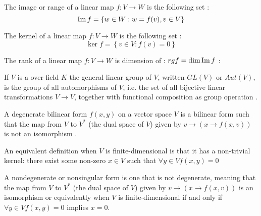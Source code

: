 \begin{appendices}
\begin{definition}[Image]
  The image or range of a linear map $f: V \to W$ is the following
  set \cite{wiki:linearmap}:
  \[
  \operatorname{Im} f = \left\{
  w \in W: w = f(v), v \in V
  \right\}
  \]
  \label{def:image}
\end{definition}

\begin{definition}[Kernel]
  The kernel of a linear map $f: V \to W$ is the following
  set \cite{wiki:kernel}:
  \[
  \ker f = \left\{
  v \in V: f(v) = 0
  \right\}
  \]
  \label{def:kernel}
\end{definition}


\begin{definition}[Rank]
  The rank of a linear map $f: V \to W$ is dimension of
  : $rg f = \dim \operatorname{Im} f$ \cite{wiki:rank}:
  \label{def:rank}
\end{definition}

\begin{definition}
  If $V$ is a  over field $K$  the general
  linear group of $V$, written $GL\left(V\right)$ or
  $Aut\left(V\right)$, is the group of all automorphisms of $V$,
  i.e. the set of all bijective linear transformations $V \to V$,
  together with functional composition as group operation \cite{wiki:glg}.  
  \label{def:glv}
\end{definition}

\begin{definition}
  A degenerate bilinear form $f(x, y)$ on a vector space $V$ is a
  bilinear form such that the map from $V$ to $V^\ast$ (the dual space
  of $V$) given by $v \to (x \to f(x, v) )$ is not an isomorphism
  \cite{wiki:dbf}. 

  An equivalent definition when $V$ is finite-dimensional is that it
  has a non-trivial kernel: there exist some non-zero $x \in V$ such
  that 
  \(
  \forall y \in V f(x,y) = 0
  \)
  \label{def:degeneratebf}
\end{definition}

\begin{definition}
  A nondegenerate or nonsingular form is one that is not degenerate,
  meaning that the map from $V$ to $V^\ast$ (the dual space
  of $V$) given by $v \to (x \to f(x, v) )$ is an isomorphism
  \cite{wiki:dbf} or equivalently when $V$ is finite-dimensional if
  and only if
  \(
  \forall y \in V f(x,y) = 0
  \)
  implies $x = 0$.
  \label{def:nondegeneratebf}
\end{definition}



\end{appendices}
